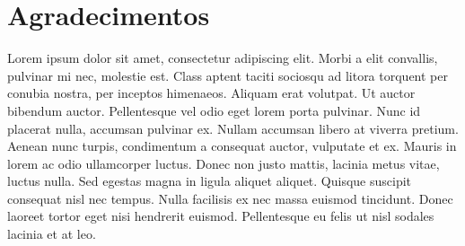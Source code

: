 \section{Agradecimentos}
Lorem ipsum dolor sit amet, consectetur adipiscing elit. Morbi a elit convallis, pulvinar mi nec, molestie est. Class aptent taciti sociosqu ad litora torquent per conubia nostra, per inceptos himenaeos. Aliquam erat volutpat. Ut auctor bibendum auctor. Pellentesque vel odio eget lorem porta pulvinar. Nunc id placerat nulla, accumsan pulvinar ex. Nullam accumsan libero at viverra pretium. Aenean nunc turpis, condimentum a consequat auctor, vulputate et ex. Mauris in lorem ac odio ullamcorper luctus. Donec non justo mattis, lacinia metus vitae, luctus nulla. Sed egestas magna in ligula aliquet aliquet. Quisque suscipit consequat nisl nec tempus. Nulla facilisis ex nec massa euismod tincidunt. Donec laoreet tortor eget nisi hendrerit euismod. Pellentesque eu felis ut nisl sodales lacinia et at leo.